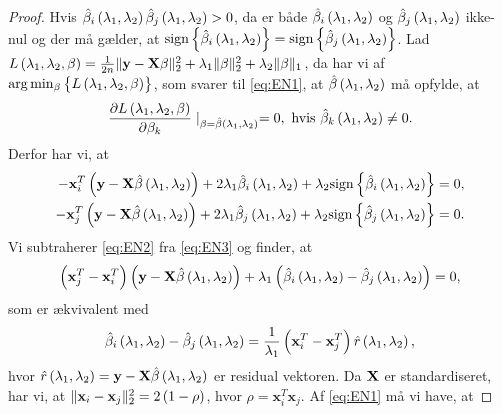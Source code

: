 \begin{proof}
Hvis \(\hat{\beta}_i \del{\lambda_1, \lambda_2} \hat{\beta}_j \del{\lambda_1, \lambda_2} > 0\), da er både \(\hat{\beta}_i \del{\lambda_1, \lambda_2}\) og \(\hat{\beta}_j \del{\lambda_1, \lambda_2}\) ikke-nul og der må gælder, at \(\text{sign} \cbr{\hat{\beta}_i \del{\lambda_1, \lambda_2}} = \text{sign} \cbr{\hat{\beta}_j \del{\lambda_1, \lambda_2}}\).
Lad \(L \del{\lambda_1,\lambda_2, \beta} = \frac{1}{2n} \Vert \y - \X \beta \Vert_2^2 + \lambda_1 \Vert \beta \Vert_2^2 + \lambda_2 \Vert \beta \Vert_1\), da har vi af  \(\arg \min_{\beta} \cbr{L \del{\lambda_1,\lambda_2, \beta}}\), som svarer til  \eqref{eq:EN1}, at \(\hat{\beta} \del{\lambda_1, \lambda_2}\) må opfylde, at
\begin{align*}
\frac{\partial L \del{\lambda_1,\lambda_2, \beta} }{\partial \beta_k} \mid_{\beta = \hat{\beta} \del{\lambda_1, \lambda_2}}=0, \text{ hvis } \hat{\beta}_k \del{\lambda_1, \lambda_2} \neq 0.
\end{align*}
Derfor har vi, at
\begin{align}
-\mathbf{x}_i^T \del{\y - \X \hat{\beta} \del{\lambda_1, \lambda_2}} + 2 \lambda_1 \hat{\beta}_i \del{\lambda_1, \lambda_2} + \lambda_2 \text{sign} \cbr{\hat{\beta}_i \del{\lambda_1, \lambda_2}} &= 0, \label{eq:EN2}\\
-\mathbf{x}_j^T \del{\y - \X \hat{\beta} \del{\lambda_1, \lambda_2}} + 2 \lambda_1 \hat{\beta}_j \del{\lambda_1, \lambda_2} + \lambda_2 \text{sign} \cbr{\hat{\beta}_j \del{\lambda_1, \lambda_2}} &= 0. \label{eq:EN3}
\end{align}
Vi subtraherer \eqref{eq:EN2} fra \eqref{eq:EN3} og finder, at
\begin{align*}
\del{\mathbf{x}_j^T-\mathbf{x}_i^T} \del{\y - \X \hat{\beta} \del{\lambda_1, \lambda_2}} + \lambda_1 \del{\hat{\beta}_i \del{\lambda_1, \lambda_2} - \hat{\beta}_j \del{\lambda_1, \lambda_2}} =0,
\end{align*}
som er ækvivalent med
\begin{align}
\hat{\beta}_i \del{\lambda_1, \lambda_2} - \hat{\beta}_j \del{\lambda_1, \lambda_2} = \frac{1}{\lambda_1} \del{\mathbf{x}_i^T-\mathbf{x}_j^T} \hat{r}\del{\lambda_1, \lambda_2}, \label{eq:EN4}
\end{align}
hvor \(\hat{r}\del{\lambda_1, \lambda_2} = \y - \X  \hat{\beta} \del{\lambda_1, \lambda_2}\) er residual vektoren.
Da \(\mathbf{X}\) er standardiseret, har vi, at \(\Vert \mathbf{x}_i - \mathbf{x}_j \Vert_2^2=2 \del{1-\rho}\), hvor \(\rho = \mathbf{x}_i^T \mathbf{x}_j\).
Af \eqref{eq:EN1} må vi have, at

\end{proof}
